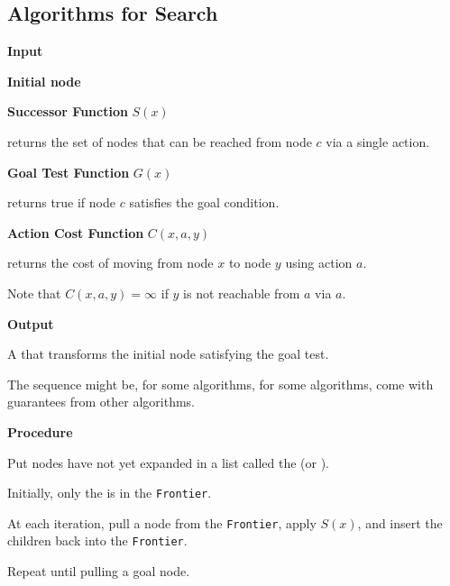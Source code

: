 \subsection{Algorithms for Search}

\begin{listu}
    \item \textbf{Input}
    
    \begin{listu}
        \item \textbf{Initial node}

        \item \textbf{Successor Function} $S(x)$
        
        returns the set of nodes that can be reached from node $c$ via a single action. 

        \item \textbf{Goal Test Function} $G(x)$
        
        returns true if node $c$ satisfies the goal condition. 

        \item \textbf{Action Cost Function} $C(x, a, y)$
        
        returns the cost of moving from node $x$ to node $y$ using action $a$.

        Note that $C(x, a, y) = \infty$ if $y$ is not reachable from $a$ via $a$. 
    \end{listu}

    \item \textbf{Output}
    
    \begin{listu}
        \item A  that transforms the initial node satisfying the goal test. 
        \item The sequence might be,  for some algorithms,  for some algorithms, come with  guarantees from other algorithms.
    \end{listu}

    \item \textbf{Procedure}
    
    \begin{listu}
        \item Put nodes have not yet expanded in a list called the  (or ).
        \item Initially, only the  is in the \texttt{Frontier}.
        \item At each iteration, pull a node from the \texttt{Frontier}, apply $S(x)$, and insert the children back into the \texttt{Frontier}.
        \item Repeat until pulling a goal node.
    \end{listu}
\end{listu}

